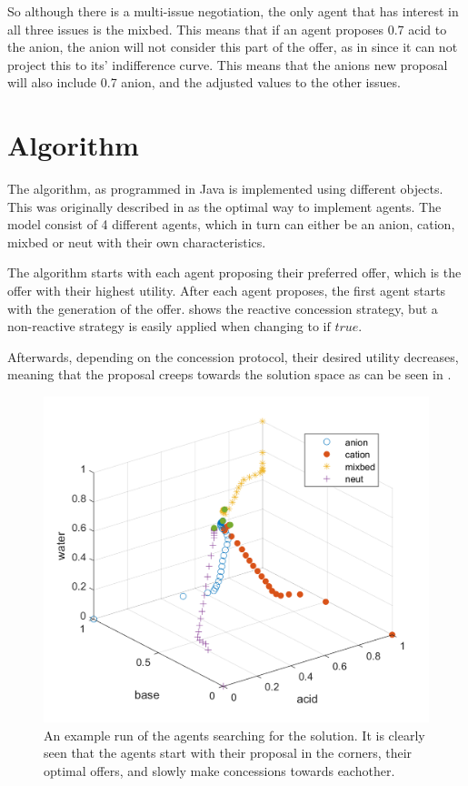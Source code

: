 So although there is a multi-issue negotiation, the only agent that has interest in all three issues is the mixbed. This means that if an agent proposes 0.7 acid to the anion, the anion will not consider this part of the offer, as in since it can not project this to its' indifference curve. This means that the anions new proposal will also include 0.7 anion, and the adjusted values to the other issues.

\clearpage
\section{Algorithm}
The algorithm, as programmed in Java is implemented using different objects. This was originally described in  as the optimal way to implement agents. The model consist of 4 different agents, which in turn can either be an anion, cation, mixbed or neut with their own characteristics.

The algorithm starts with each agent proposing their preferred offer, which is the offer with their highest utility. After each agent proposes, the first agent starts with the generation of the offer.  shows the reactive concession strategy, but a non-reactive strategy is easily applied when changing  to $\text{if } true$.

Afterwards, depending on the concession protocol, their desired utility decreases, meaning that the proposal creeps towards the solution space as can be seen in . 
\begin{figure}[h]
	\centering
	\includegraphics[width=0.7\linewidth]{img/searchforsolution}
	\caption{An example run of the agents searching for the solution. It is clearly seen that the agents start with their proposal in the corners, their optimal offers, and slowly make concessions towards eachother.}
	\label{fig:searchforsolution}
\end{figure}

